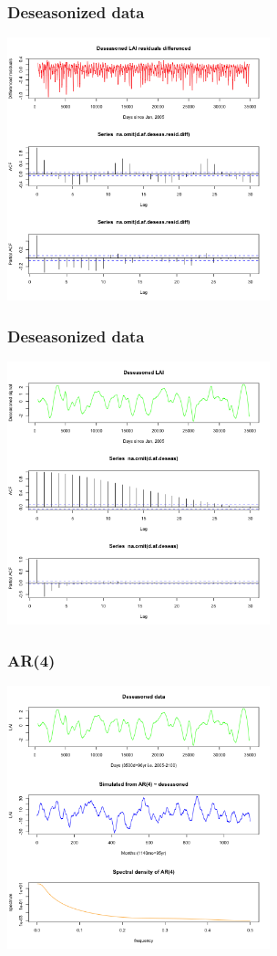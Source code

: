 \documentclass{beamer}
\begin{document}
\begin{frame}
\frametitle{Deseasonized data}
\includegraphics[height=3in]{../img/deseasonalization_resid_difference.png}
\end{frame}

\begin{frame}
\frametitle{Deseasonized data}
\includegraphics[height=3in]{../img/deseasonalization.png}
\end{frame}

\begin{frame}
\frametitle{AR(4)}
\includegraphics[height=3in]{../img/ar_sim.png}
\end{frame}
\end{document}
